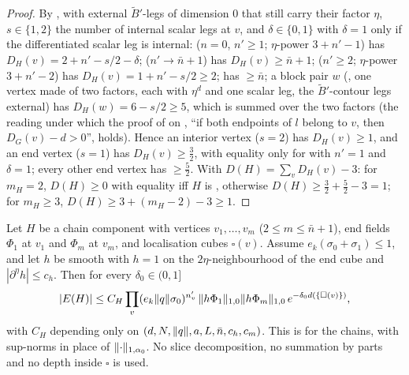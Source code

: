 \begin{proof}
By \cite[(2.1)]{Ba3}, with external $\tilde B'$-legs of dimension $0$ that still carry their factor $\eta$, $s\in\{1,2\}$ the number of internal scalar legs at $v$, and $\delta\in\{0,1\}$ with $\delta=1$ only if the differentiated scalar leg is internal: \cite[(1.8)]{Ba3} ($n=0$, $n'\ge1$; $\eta$-power $3+n'-1$) has $D_H(v)=2+n'-s/2-\delta$; \cite[(1.9)]{Ba3} ($n'\to\bar n+1$) has $D_H(v)\ge\bar n+1$; \cite[(1.10)]{Ba3} ($n'\ge2$; $\eta$-power $3+n'-2$) has $D_H(v)=1+n'-s/2\ge2$; \cite[(1.11)]{Ba3} has $\ge\bar n$; a block pair $w$ (\cite[(1.18)]{Ba3}, one vertex made of two factors, each with $\eta^d$ and one scalar leg, the $\tilde B'$-contour legs external) has $D_H(w)=6-s/2\ge5$, which is \cite[p.~423 (v)]{Ba3} summed over the two factors (the reading under which the proof of \cite[Cor.~2.3]{Ba3} on \cite[p.~428]{Ba3}, ``if both endpoints of $l$ belong to $v$, then $D_G(v)-d>0$'', holds). Hence an interior vertex ($s=2$) has $D_H(v)\ge1$, and an end vertex ($s=1$) has $D_H(v)\ge\frac32$, with equality only for \cite[(1.8)]{Ba3} with $n'=1$ and $\delta=1$; every other end vertex has $\ge\frac52$. With $D(H)=\sum_vD_H(v)-3$: for $m_H=2$, $D(H)\ge0$ with equality iff $H$ is \cite[(2.4)]{Ba3}, otherwise $D(H)\ge\frac32+\frac52-3=1$; for $m_H\ge3$, $D(H)\ge3+(m_H-2)-3\ge1$.
\end{proof}

\begin{lemma}\label{sup4:lem:S163}
Let $H$ be a chain component with vertices $v_1,\dots,v_m$ ($2\le m\le\bar n+1$), end fields $\Phi_1$ at $v_1$ and $\Phi_m$ at $v_m$, and localisation cubes $\square(v)$. Assume $e_k(\sigma_0+\sigma_1)\le1$, and let $h$ be smooth with $h=1$ on the $2\eta$-neighbourhood of the end cube and $|\partial^\eta h|\le c_h$. Then for every $\delta_0\in(0,1]$
\[
|E(H)|\le C_H\prod_v(e_k\lVert q\rVert\sigma_0)^{n'_v}\,\lVert h\Phi_1\rVert_{1,0}\lVert h\Phi_m\rVert_{1,0}\,e^{-\delta_0d(\{\square(v)\})},
\]
with $C_H$ depending only on $(d,N,\lVert q\rVert,a,L,\bar n,c_h,c_m)$. This is \cite[(3.2)]{Ba3} for the chains, with sup-norms in place of $\lVert \cdot\rVert_{1,\alpha_0}$. No slice decomposition, no summation by parts and no depth inside $\square$ is used.
\end{lemma}

